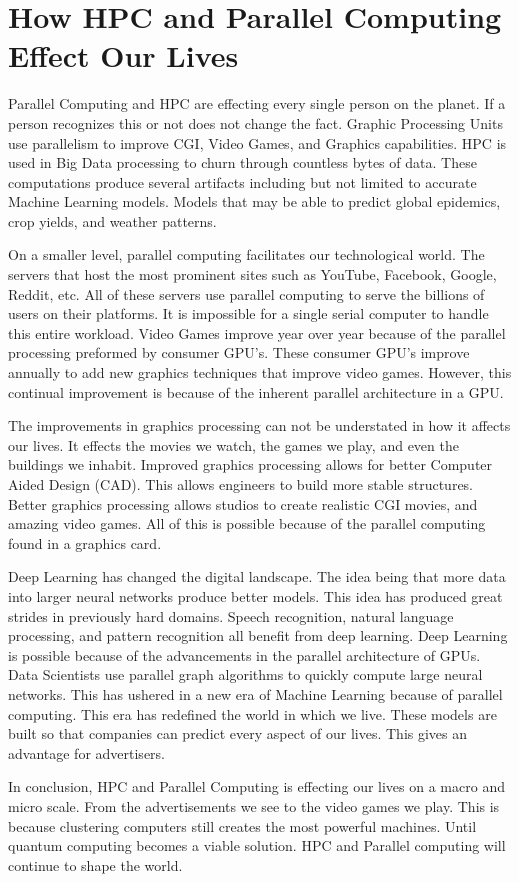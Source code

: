 \setlength{\parindent}{10ex}


\section{How HPC and Parallel Computing Effect Our Lives}
Parallel Computing and HPC are effecting every single person on the planet.
If a person recognizes this or not does not change the fact. 
Graphic Processing Units use parallelism to improve CGI, Video Games, and Graphics capabilities.
HPC is used in Big Data processing to churn through countless bytes of data.
These computations produce several artifacts including but not limited to accurate Machine Learning models.
Models that may be able to predict global epidemics, crop yields, and weather patterns.

\par
On a smaller level, parallel computing facilitates our technological world. 
The servers that host the most prominent sites such as YouTube, Facebook, Google, Reddit, etc.
All of these servers use parallel computing to serve the billions of users on their platforms.
It is impossible for a single serial computer to handle this entire workload. 
Video Games improve year over year because of the parallel processing preformed by consumer GPU's.
These consumer GPU's improve annually to add new graphics techniques that improve video games.
However, this continual improvement is because of the inherent parallel architecture in a GPU.

\par
The improvements in graphics processing can not be understated in how it affects our lives.
It effects the movies we watch, the games we play, and even the buildings we inhabit.
Improved graphics processing allows for better Computer Aided Design (CAD).
This allows engineers to build more stable structures.
Better graphics processing allows studios to create realistic CGI movies, and amazing video games.
All of this is possible because of the parallel computing found in a graphics card.

\par
Deep Learning has changed the digital landscape. 
The idea being that more data into larger neural networks produce better models.
This idea has produced great strides in previously hard domains.
Speech recognition, natural language processing, and pattern recognition all benefit from deep learning.
Deep Learning is possible because of the advancements in the parallel architecture of GPUs.
Data Scientists use parallel graph algorithms to quickly compute large neural networks.
This has ushered in a new era of Machine Learning because of parallel computing.
This era has redefined the world in which we live.
These models are built so that companies can predict every aspect of our lives.
This gives an advantage for advertisers.

\par 
In conclusion, HPC and Parallel Computing is effecting our lives on a macro and micro scale. 
From the advertisements we see to the video games we play. 
This is because clustering computers still creates the most powerful machines.
Until quantum computing becomes a viable solution.
HPC and Parallel computing will continue to shape the world.
